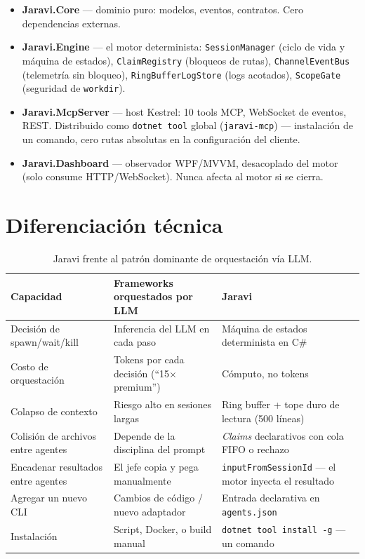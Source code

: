 \documentclass[11pt]{article}
\begin{document}
\begin{itemize}
\item \textbf{Jaravi.Core} --- dominio puro: modelos, eventos, contratos. Cero dependencias externas.
\item \textbf{Jaravi.Engine} --- el motor determinista: \texttt{SessionManager} (ciclo de vida y máquina de estados), \texttt{ClaimRegistry} (bloqueos de rutas), \texttt{ChannelEventBus} (telemetría sin bloqueo), \texttt{RingBufferLogStore} (logs acotados), \texttt{ScopeGate} (seguridad de \texttt{workdir}).
\item \textbf{Jaravi.McpServer} --- host Kestrel: 10 tools MCP, WebSocket de eventos, REST. Distribuido como \texttt{dotnet tool} global (\texttt{jaravi-mcp}) --- instalación de un comando, cero rutas absolutas en la configuración del cliente.
\item \textbf{Jaravi.Dashboard} --- observador WPF/MVVM, desacoplado del motor (solo consume HTTP/WebSocket). Nunca afecta al motor si se cierra.
\end{itemize}

\section{Diferenciación técnica}

\begin{table}[h]
\centering
\footnotesize
\begin{tabularx}{\textwidth}{X X X}
\toprule
\textbf{Capacidad} & \textbf{Frameworks orquestados por LLM} & \textbf{Jaravi} \\
\midrule
Decisión de spawn/wait/kill & Inferencia del LLM en cada paso & Máquina de estados determinista en C\# \\
Costo de orquestación & Tokens por cada decisión (``15$\times$ premium'') & Cómputo, no tokens \\
Colapso de contexto & Riesgo alto en sesiones largas & Ring buffer + tope duro de lectura (500 líneas) \\
Colisión de archivos entre agentes & Depende de la disciplina del prompt & \emph{Claims} declarativos con cola FIFO o rechazo \\
Encadenar resultados entre agentes & El jefe copia y pega manualmente & \texttt{inputFromSessionId} --- el motor inyecta el resultado \\
Agregar un nuevo CLI & Cambios de código / nuevo adaptador & Entrada declarativa en \texttt{agents.json} \\
Instalación & Script, Docker, o build manual & \texttt{dotnet tool install -g} --- un comando \\
\bottomrule
\end{tabularx}
\caption{Jaravi frente al patrón dominante de orquestación vía LLM.}
\end{table}
\end{document}

